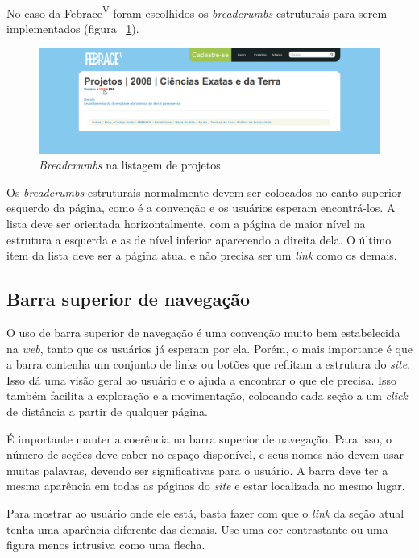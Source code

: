 No caso da Febrace\textsuperscript{V} foram escolhidos os \textit{breadcrumbs} estruturais para serem implementados (figura ~\ref{breadcrumbs}).

    \begin{figure}[h]
        \begin{center}
    \includegraphics[width=0.7\linewidth]{arquivos/breadcrumbs.png}
        \end{center}
        \caption{\textit{Breadcrumbs} na listagem de projetos}
        \label{breadcrumbs}
    \end{figure}

Os \textit{breadcrumbs} estruturais normalmente devem ser colocados no canto superior esquerdo da página, como é a convenção e os usuários esperam encontrá-los. A lista deve ser orientada horizontalmente, com a página de maior nível na estrutura a esquerda e as de nível inferior aparecendo a direita dela. O último item da lista deve ser a página atual e não precisa ser um \textit{link} como os demais.

\subsection{Barra superior de navegação}

O uso de barra superior de navegação é uma convenção muito bem estabelecida na \textit{web}, tanto que os usuários já esperam por ela. Porém, o mais importante é que a barra contenha um conjunto de links ou botões que reflitam a estrutura do \textit{site}. Isso dá uma visão geral ao usuário e o ajuda a encontrar o que ele precisa. Isso também facilita a exploração e a movimentação, colocando cada seção a um \textit{click} de distância a partir de qualquer página.

É importante manter a coerência na barra superior de navegação. Para isso, o número de seções deve caber no espaço disponível, e seus nomes não devem usar muitas palavras, devendo ser significativas para o usuário. A barra deve ter a mesma aparência em todas as páginas do \textit{site} e estar localizada no mesmo lugar.

Para mostrar ao usuário onde ele está, basta fazer com que o \textit{link} da seção atual tenha uma aparência diferente das demais. Use uma cor contrastante ou uma figura menos intrusiva como uma flecha.

